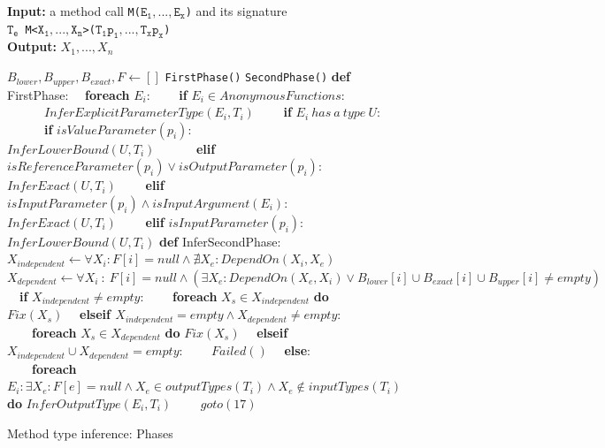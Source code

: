 \begin{figure}
\begin{framed}
\textbf{Input:} a method call \texttt{M($\mathtt{E_1, ..., E_x}$)} and its signature\\
\hspace*{\algorithmicindent} \texttt{$\mathtt{T_e}$ M<$\mathtt{X_1, ..., X_n}$>($\mathtt{T_1 p_1, ..., T_x p_x}$)}\\
\textbf{Output:} $X_1, ..., X_n$
\begin{algorithmic}
\State $B_{lower}, B_{upper}, B_{exact}, F \gets []$
\State \texttt{FirstPhase()}
\State \texttt{SecondPhase()}
\State \textbf{def} FirstPhase:
\State \ \ \textbf{foreach} $E_i$:
\State \ \ \ \ \textbf{if} $E_i \in AnonymousFunctions$:
\State \ \ \ \ \ \ $InferExplicitParameterType(E_i, T_i)$
\State \ \ \ \ \textbf{if} $E_i\ has\ a\ type\ U$:
\State \ \ \ \ \ \ \textbf{if} $isValueParameter(p_i)$:
\State \ \ \ \ \ \ \ \ $InferLowerBound(U, T_i)$
\State \ \ \ \ \ \ \textbf{elif} $isReferenceParameter(p_i) \vee isOutputParameter(p_i)$:
\State \ \ \ \ \ \ $InferExact(U, T_i)$
\State \ \ \ \ \textbf{elif} $isInputParameter(p_i) \wedge isInputArgument(E_i)$:
\State \ \ \ \ \ \ $InferExact(U, T_i)$
\State \ \ \ \ \textbf{elif} $isInputParameter(p_i)$:
\State \ \ \ \ \ \ $InferLowerBound(U, T_i)$
\State \textbf{def} InferSecondPhase:
\State \ \ $X_{independent} \gets \forall X_i : F[i] = null \wedge \nexists X_e : DependOn(X_i, X_e)$
\State \ \ $X_{dependent} \gets \forall X_i\ :\ F[i] = null \wedge (\exists X_e : DependOn(X_e, X_i) \vee B_{lower}[i] \cup B_{exact}[i] \cup B_{upper}[i] \neq empty)$
\State \ \ \textbf{if} $X_{independent} \neq empty$:
\State \ \ \ \ \textbf{foreach} $X_s \in X_{independent}$ \textbf{do} $Fix(X_s)$  
\State \ \ \textbf{elseif $X_{independent} = empty \wedge X_{dependent} \neq empty$}:
\State \ \ \ \ \textbf{foreach} $X_s \in X_{dependent}$ \textbf{do} $Fix(X_s)$ 
\State \ \ \textbf{elseif} $X_{independent} \cup X_{dependent} = empty$:
\State \ \ \ \ $Failed()$
\State \ \ \textbf{else}:
\State \ \ \ \ \textbf{foreach} $E_i : \exists X_e : F[e] = null \wedge X_e \in outputTypes(T_i) \wedge X_e \notin inputTypes(T_i)$ \textbf{do} $InferOutputType(E_i, T_i)$ 
\State \ \ \ \ $goto(17)$
\end{algorithmic}
\end{framed}
\caption{Method type inference: Phases}
\label{img07:methodTypeInference}
\end{figure}
\par
